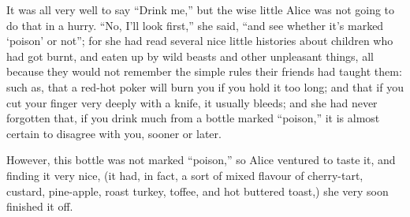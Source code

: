 \documentclass[
  12pt,
  twoside]{article}
\begin{document}
It was all very well to say ``Drink me,'' but the wise little Alice was
not going to do that in a hurry. ``No, I'll look first,'' she said,
``and see whether it's marked `poison' or not''; for she had read
several nice little histories about children who had got burnt, and
eaten up by wild beasts and other unpleasant things, all because they
would not remember the simple rules their friends had taught them: such
as, that a red-hot poker will burn you if you hold it too long; and that
if you cut your finger very deeply with a knife, it usually bleeds; and
she had never forgotten that, if you drink much from a bottle marked
``poison,'' it is almost certain to disagree with you, sooner or later.

However, this bottle was not marked ``poison,'' so Alice ventured to
taste it, and finding it very nice, (it had, in fact, a sort of mixed
flavour of cherry-tart, custard, pine-apple, roast turkey, toffee, and
hot buttered toast,) she very soon finished it off.
\end{document}
